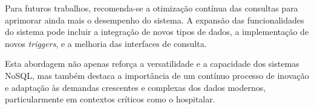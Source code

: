 Para futuros trabalhos, recomenda-se a otimização contínua das consultas para aprimorar ainda mais o desempenho do sistema. A expansão das funcionalidades do sistema pode incluir a integração de novos tipos de dados, a implementação de novos \textit{triggers}, e a melhoria das interfaces de consulta. 

Esta abordagem não apenas reforça a versatilidade e a capacidade dos sistemas NoSQL, mas também destaca a importância de um contínuo processo de inovação e adaptação às demandas crescentes e complexas dos dados modernos, particularmente em contextos críticos como o hospitalar.
